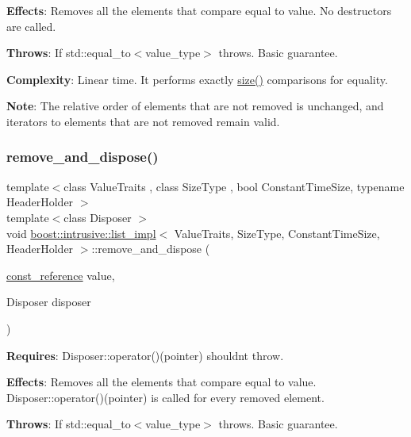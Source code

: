 {\bfseries Effects}\+: Removes all the elements that compare equal to value. No destructors are called.

{\bfseries Throws}\+: If std\+::equal\+\_\+to$<$value\+\_\+type$>$ throws. Basic guarantee.

{\bfseries Complexity}\+: Linear time. It performs exactly \hyperlink{classboost_1_1intrusive_1_1list__impl_a9da0074a31566f3a7dbc3cd1a2d752c1}{size()} comparisons for equality.

{\bfseries Note}\+: The relative order of elements that are not removed is unchanged, and iterators to elements that are not removed remain valid. \mbox{\label{classboost_1_1intrusive_1_1list__impl_ab52f7ab80a51b6364f950a3e7521018b}} 
\subsubsection{\texorpdfstring{remove\+\_\+and\+\_\+dispose()}{remove\_and\_dispose()}}
{\footnotesize\ttfamily template$<$class Value\+Traits , class Size\+Type , bool Constant\+Time\+Size, typename Header\+Holder $>$ \\
template$<$class Disposer $>$ \\
void \hyperlink{classboost_1_1intrusive_1_1list__impl}{boost\+::intrusive\+::list\+\_\+impl}$<$ Value\+Traits, Size\+Type, Constant\+Time\+Size, Header\+Holder $>$\+::remove\+\_\+and\+\_\+dispose (\begin{DoxyParamCaption}\item[{\hyperlink{classboost_1_1intrusive_1_1list__impl_a3d37629151c76fb8389ac3ba3b359201}{const\+\_\+reference}}]{value,  }\item[{Disposer}]{disposer }\end{DoxyParamCaption})\hspace{0.3cm}{\ttfamily [inline]}}

{\bfseries Requires}\+: Disposer\+::operator()(pointer) shouldn\textquotesingle{}t throw.

{\bfseries Effects}\+: Removes all the elements that compare equal to value. Disposer\+::operator()(pointer) is called for every removed element.

{\bfseries Throws}\+: If std\+::equal\+\_\+to$<$value\+\_\+type$>$ throws. Basic guarantee.

